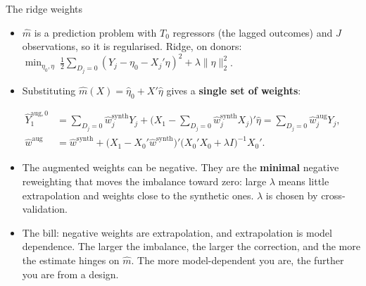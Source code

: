 \documentclass[
  11pt,
  ignorenonframetext,
  aspectratio=169,
]{beamer}
\providecommand{\tightlist}{%
  \setlength{\itemsep}{0pt}\setlength{\parskip}{0pt}}
\begin{document}
\begin{frame}{The ridge weights}
\protect{}\label{the-ridge-weights}
\begin{itemize}
\tightlist
\item
  \(\hat m\) is a prediction problem with \(T_0\) regressors (the lagged
  outcomes) and \(J\) observations, so it is regularised. Ridge, on
  donors:
  \(\min_{\eta_0, \eta}\ \tfrac{1}{2} \sum_{D_j = 0} ( Y_j - \eta_0 - X_j' \eta )^2 + \lambda \|\eta\|_2^2\).
\item
  Substituting \(\hat m(X) = \hat\eta_0 + X'\hat\eta\) gives a
  \textbf{single set of weights}:
\end{itemize}

\small

\[
\begin{aligned}
\hat Y^{\text{aug},0}_1 &= \textstyle\sum_{D_j = 0} \hat w_j^{\text{synth}} Y_j + \big( X_1 - \sum_{D_j = 0} \hat w_j^{\text{synth}} X_j \big)' \hat\eta = \sum_{D_j = 0} \hat w_j^{\text{aug}} Y_j, \\
\hat w^{\text{aug}} &= \hat w^{\text{synth}} + \big( X_1 - X_0' \hat w^{\text{synth}} \big)' \big( X_0' X_0 + \lambda I \big)^{-1} X_0' .
\end{aligned}
\] \normalsize

\begin{itemize}
\tightlist
\item
  The augmented weights can be negative. They are the \textbf{minimal}
  negative reweighting that moves the imbalance toward zero: large
  \(\lambda\) means little extrapolation and weights close to the
  synthetic ones. \(\lambda\) is chosen by cross-validation.
\item
  The bill: negative weights are extrapolation, and extrapolation is
  model dependence. The larger the imbalance, the larger the correction,
  and the more the estimate hinges on \(\hat m\). The more
  model-dependent you are, the further you are from a design.
\end{itemize}
\end{frame}
\end{document}
